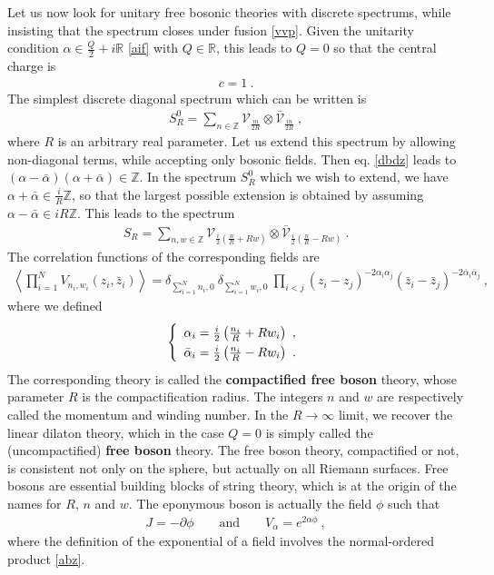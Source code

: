 \documentclass[12pt, a4paper, notitlepage, twoside]{report}
\numberwithin{equation}{section}
\theoremstyle{break}
\begin{document}
Let us now look for unitary free bosonic theories with discrete spectrums, while insisting that the spectrum closes under fusion \eqref{vvp}.
Given the unitarity condition $\alpha\in \frac{Q}{2}+i{\mathbb{R}}$ \eqref{aif} with $Q\in {\mathbb{R}}$, this leads to $Q=0$ so that the central charge is 
\begin{align}
 c=1\ .
\end{align}
The simplest discrete diagonal spectrum which can be written is 
\begin{align}
 S_R^0=\sum_{n\in{\mathbb{Z}}} \mathcal{V}_{\frac{in}{2R}}\otimes \bar{\mathcal{V}}_{\frac{in}{2R}}\ ,
\end{align}
where $R$ is an arbitrary real parameter.
Let us extend this spectrum by allowing non-diagonal terms, while accepting only bosonic fields.
Then eq. \eqref{dbdz} leads to $(\alpha-\bar{\alpha})(\alpha+\bar{\alpha})\in {\mathbb{Z}}$.
In the spectrum $S_R^0$ which we wish to extend, we have $\alpha+\bar{\alpha}\in\frac{i}{R}{\mathbb{Z}}$, so that the largest possible extension is obtained by assuming $\alpha-\bar{\alpha}\in iR{\mathbb{Z}}$.
This leads to the spectrum
\begin{align}
 \boxed{S_R = \sum_{n,w\in {\mathbb{Z}}} \mathcal{V}_{\frac{i}{2}\left(\frac{n}{R} + Rw\right)} \otimes \bar{\mathcal{V}}_{\frac{i}{2}\left(\frac{n}{R} - Rw\right)} }\ .
\label{sr}
\end{align}
The correlation functions of the corresponding fields are 
\begin{align}
 \left\langle \prod_{i=1}^N V_{n_i,w_i}(z_i,\bar{z}_i) \right\rangle = \delta_{\sum_{i=1}^N n_i,0}\ \delta_{\sum_{i=1}^N w_i,0}\ \prod_{i<j} (z_i-z_j)^{-2\alpha_i\alpha_j}(\bar{z}_i-\bar{z}_j)^{-2\bar{\alpha}_i\bar{\alpha}_j}\ , 
\end{align}
where we defined
\begin{align}
\renewcommand{\arraystretch}{1.3}
\left\{\begin{array}{l}  \alpha_i = \frac{i}{2}\left(\frac{n_i}{R} + Rw_i \right)\ , \\ \bar{\alpha}_i = \frac{i}{2}\left(\frac{n_i}{R} - Rw_i \right) \ . \end{array}\right. 
\end{align}
The corresponding theory is called the \textbf{\boldmath compactified free boson} theory, whose parameter $R$ is  the compactification radius.
The integers $n$ and $w$ are respectively called the momentum and winding number.
In the $R\to \infty$ limit, we recover the linear dilaton theory, which in the case $Q=0$ is simply called the (uncompactified) \textbf{\boldmath free boson} theory. 
The free boson theory, compactified or not, is consistent not only on the sphere, but actually on all Riemann surfaces.
Free bosons are essential building blocks of string theory, which is at the origin of the names for $R$, $n$ and $w$.
The eponymous boson is actually the field $\phi$ such that 
\begin{align}
 J = -\partial \phi \qquad \text{and} \qquad V_\alpha = e^{2\alpha\phi}\ ,
\label{jpf}
\end{align}
where the definition of the exponential of a field involves the normal-ordered product \eqref{abz}. 
\end{document}
